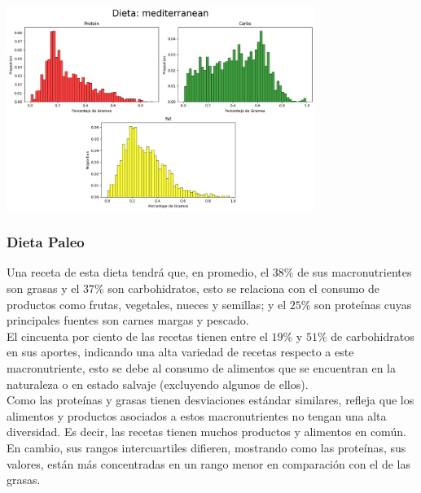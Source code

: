 \documentclass[12pt,a4paper]{article}
\begin{document}
            \begin{center}
                \includegraphics[width=0.75\textwidth]{Resources/2_03_plot_03.png}
            \end{center}

        \subsubsection{Dieta Paleo}

            Una receta de esta dieta tendrá que, en promedio, el $38\%$ de sus 
            macronutrientes son grasas y el $37\%$ son carbohidratos, esto se 
            relaciona con el consumo de productos como frutas, vegetales, nueces 
            y semillas; y el $25\%$ son proteínas cuyas principales fuentes son 
            carnes margas y pescado.\\

            El cincuenta por ciento de las recetas tienen entre el $19\%$ y $51\%$ 
            de carbohidratos en sus aportes, indicando una alta variedad de recetas 
            respecto a este macronutriente, esto se debe al consumo de alimentos que 
            se encuentran en la naturaleza o en estado salvaje (excluyendo algunos 
            de ellos).\\

            Como las proteínas y grasas tienen desviaciones estándar similares, refleja 
            que los alimentos y productos asociados a estos macronutrientes no tengan 
            una alta diversidad. Es decir, las recetas tienen muchos productos y alimentos 
            en común. En cambio, sus rangos intercuartiles difieren, mostrando como 
            las proteínas, sus valores, están más concentradas en un rango menor en 
            comparación con el de las grasas.
\end{document}
